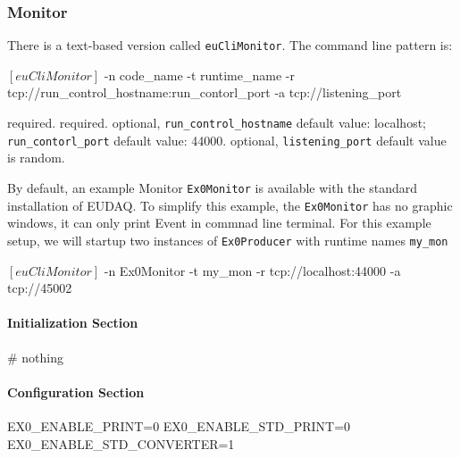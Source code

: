 \subsubsection{Monitor}
\label{sec:onlinemonitor}
There is a text-based version called \texttt{euCliMonitor}.
The command line pattern is:
\begin{listing}[mybash]
$[euCliMonitor]$ -n {code_name} -t {runtime_name} -r tcp://{run_control_hostname}:{run_contorl_port} -a tcp://{listening_port}
\end{listing}
\begin{description}
required.
required.
optional, \texttt{run\_control\_hostname} default value: localhost;  \texttt{run\_contorl\_port}  default value: 44000.
optional, \texttt{listening\_port} default value is random.
\end{description}

By default, an example Monitor \texttt{Ex0Monitor} is available with the standard installation of EUDAQ. To simplify this example, the \texttt{Ex0Monitor} has no graphic windows, it can only print Event in commnad line terminal.
For this example setup, we will startup two instances of \texttt{Ex0Producer} with runtime names \texttt{my\_mon}\\
\begin{listing}[mybash]
$[euCliMonitor]$ -n Ex0Monitor -t my_mon -r tcp://localhost:44000 -a tcp://45002
\end{listing}

\paragraph{Initialization Section}
\begin{listing}
# nothing
\end{listing}

\paragraph{Configuration Section}
\begin{listing}
EX0_ENABLE_PRINT=0
EX0_ENABLE_STD_PRINT=0
EX0_ENABLE_STD_CONVERTER=1
\end{listing}

